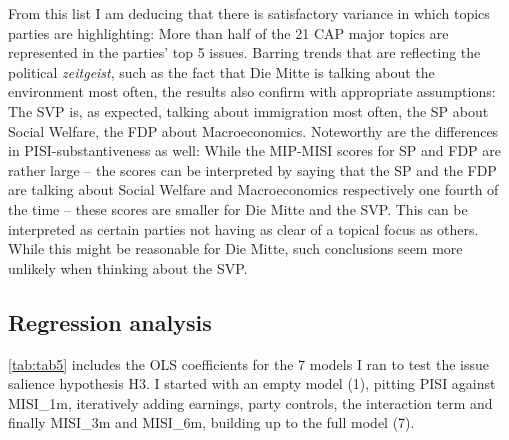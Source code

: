 \documentclass[11pt,a4paper]{article}
\begin{document}
From this list I am deducing that there is satisfactory variance in which topics parties are highlighting: More than half of the 21 CAP major topics are represented in the parties’ top 5 issues. Barring trends that are reflecting the political \textit{zeitgeist}, such as the fact that Die Mitte is talking about the environment most often, the results also confirm with appropriate assumptions: The SVP is, as expected, talking about immigration most often, the SP about Social Welfare, the FDP about Macroeconomics. Noteworthy are the differences in PISI-substantiveness as well: While the MIP-MISI scores for SP and FDP are rather large – the scores can be interpreted by saying that the SP and the FDP are talking about Social Welfare and Macroeconomics respectively one fourth of the time – these scores are smaller for Die Mitte and the SVP. This can be interpreted as certain parties not having as clear of a topical focus as others. While this might be reasonable for Die Mitte, such conclusions seem more unlikely when thinking about the SVP.


\subsection{Regression analysis}
\autoref{tab:tab5} includes the OLS coefficients for the 7 models I ran to test the issue salience hypothesis H3. I started with an empty model (1), pitting PISI against MISI\_1m, iteratively adding earnings, party controls, the interaction term and finally MISI\_3m and MISI\_6m, building up to the full model (7).
\end{document}
